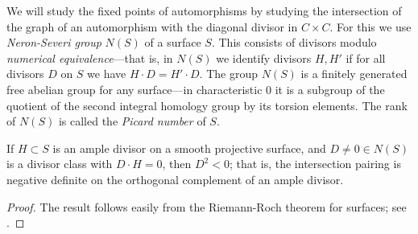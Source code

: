We will study the fixed points of automorphisms by studying the intersection of the graph of
an automorphism with the diagonal divisor in $C\times C$. For this we use
\emph{Neron-Severi group} $N(S)$ of a surface $S$. This consists of divisors modulo \emph{numerical equivalence}---that is, in $N(S)$ we identify divisors $H, H'$ if for all divisors $D$ on $S$ we have $H\cdot D = H'\cdot D$. The group
$N(S)$ is a  finitely generated free abelian group for any surface---in characteristic 0 it is a subgroup of the quotient of the second integral homology group by its torsion elements. The rank of $N(S)$ is called the \emph{Picard number} of $S$. 

\begin{theorem}\label{hodge index}
If $H\subset S$ is an ample divisor on a smooth projective surface, and $D \neq 0 \in N(S)$ is a divisor class with $D\cdot H = 0$, then 
$D^2<0$; that is, the intersection pairing is negative definite on the orthogonal complement of an
ample divisor.
\end{theorem}
\begin{proof}
The result follows easily from the Riemann-Roch theorem for surfaces; see \cite[Theorem V.1.9]{Hartshorne1977}.
\end{proof}


